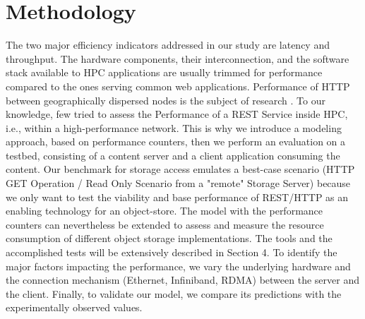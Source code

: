 \documentclass[runningheads]{llncs}
\begin{document}
\section {Methodology} \label{sec:methodology}
The two major efficiency indicators addressed in our study are latency and throughput.
The hardware components, their interconnection, and the software stack available to HPC applications are usually trimmed for performance compared to the ones serving common web applications. Performance of HTTP between geographically dispersed nodes is the subject of research \cite{tcpperfprediction}. To our knowledge, few tried to assess the Performance of a REST Service inside HPC, i.e., within a high-performance network. This is why we introduce a modeling approach, based on performance counters, then we perform an evaluation on a testbed, consisting of a content server and a client application consuming the content. Our benchmark for storage access emulates a best-case scenario (HTTP GET Operation / Read Only Scenario from a "remote" Storage Server) because we only want to test the viability and base performance of REST/HTTP as an enabling technology for an object-store. The model with the performance counters can nevertheless be extended to assess and measure the resource consumption of different object storage implementations. The tools and the accomplished tests will be extensively described in Section 4. To identify the major factors impacting the performance, we vary the underlying hardware and the connection mechanism (Ethernet, Infiniband, RDMA) between the server and the client. Finally, to validate our model, we compare its predictions with the experimentally observed values.
\end{document}
